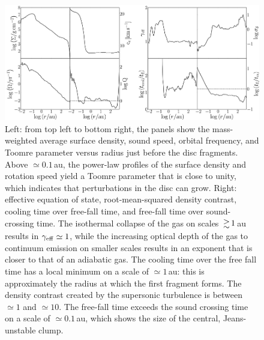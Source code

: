 \documentclass[useAMS,usenatbib]{mnras}
\newcommand{\geff}{\gamma_{\rm eff}}
\begin{document}
\begin{figure}
\begin{center}
\includegraphics[scale=0.75]{./f5.png}
\caption{Left: from top left to bottom right, the panels show the mass-weighted average surface density, sound speed, orbital frequency, and Toomre parameter versus radius just before the disc fragments. Above $\simeq 0.1\,$au, the power-law profiles of the surface density and rotation speed yield a Toomre parameter that is close to unity, which indicates that perturbations in the disc can grow. Right: effective equation of state, root-mean-squared density contrast, cooling time over free-fall time, and free-fall time over sound-crossing time. The isothermal collapse of the gas on scales $\ga 1\,$au results in $\geff \simeq 1$, while the increasing optical depth of the gas to continuum emission on smaller scales results in an exponent that is closer to that of an adiabatic gas. The cooling time over the free fall time has a local minimum on a scale of $\simeq 1\,$au: this is approximately the radius at which the first fragment forms. The density contrast created by the supersonic turbulence is between $\simeq 1$ and $\simeq 10$. The free-fall time exceeds the sound crossing time on a scale of $\simeq 0.1\,$au, which shows the size of the central, Jeans-unstable clump.}
\label{fig:disc_stability}
\end{center}
\end{figure}
\end{document}
